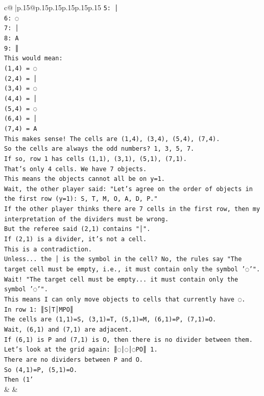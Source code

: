 \documentclass{article}
\begin{document}
{\begin{supertabular}{c@{$\;$}|p{.15\linewidth}@{}p{.15\linewidth}p{.15\linewidth}p{.15\linewidth}p{.15\linewidth}p{.15\linewidth}}
{{{\texttt{5: │} \\
\texttt{6: ◌} \\
\texttt{7: │} \\
\texttt{8: A} \\
\texttt{9: ║} \\
\texttt{This would mean:} \\
\texttt{(1,4) = ◌} \\
\texttt{(2,4) = │} \\
\texttt{(3,4) = ◌} \\
\texttt{(4,4) = │} \\
\texttt{(5,4) = ◌} \\
\texttt{(6,4) = │} \\
\texttt{(7,4) = A} \\
\texttt{This makes sense! The cells are (1,4), (3,4), (5,4), (7,4).} \\
\texttt{So the cells are always the odd numbers? 1, 3, 5, 7.} \\
\texttt{If so, row 1 has cells (1,1), (3,1), (5,1), (7,1).} \\
\texttt{That's only 4 cells. We have 7 objects.} \\
\texttt{This means the objects cannot all be on y=1.} \\
\texttt{Wait, the other player said: "Let's agree on the order of objects in the first row (y=1): S, T, M, O, A, D, P."} \\
\texttt{If the other player thinks there are 7 cells in the first row, then my interpretation of the dividers must be wrong.} \\
\texttt{But the referee said (2,1) contains "│".} \\
\texttt{If (2,1) is a divider, it's not a cell.} \\
\texttt{This is a contradiction.} \\
\texttt{Unless... the │ is the symbol in the cell? No, the rules say "The target cell must be empty, i.e., it must contain only the symbol '◌'".} \\
\texttt{Wait! "The target cell must be empty... it must contain only the symbol '◌'".} \\
\texttt{This means I can only move objects to cells that currently have ◌.} \\
\texttt{In row 1: ║S│T│MPO║} \\
\texttt{The cells are (1,1)=S, (3,1)=T, (5,1)=M, (6,1)=P, (7,1)=O.} \\
\texttt{Wait, (6,1) and (7,1) are adjacent.} \\
\texttt{If (6,1) is P and (7,1) is O, then there is no divider between them.} \\
\texttt{Let's look at the grid again: ║◌│◌│◌PO║ 1.} \\
\texttt{There are no dividers between P and O.} \\
\texttt{So (4,1)=P, (5,1)=O.} \\
\texttt{Then (1'} \\
            }
        }
    }
    & & \\ \\


\end{supertabular}}
\end{document}
